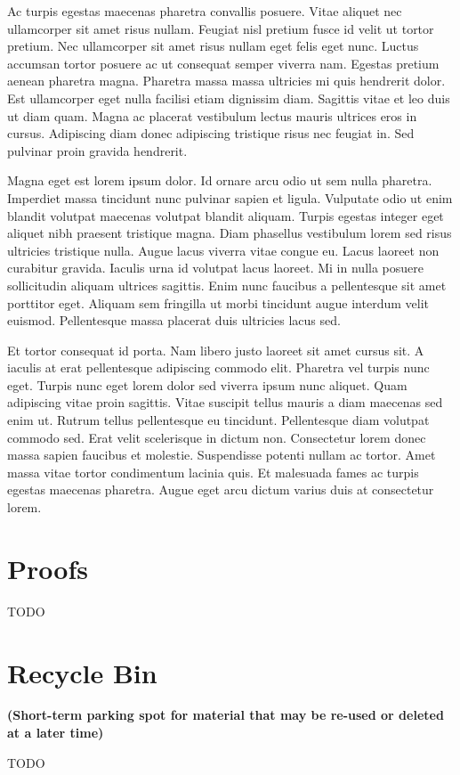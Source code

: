 Ac turpis egestas maecenas pharetra convallis posuere. Vitae aliquet nec
ullamcorper sit amet risus nullam. Feugiat nisl pretium fusce id velit ut
tortor pretium. Nec ullamcorper sit amet risus nullam eget felis eget nunc.
Luctus accumsan tortor posuere ac ut consequat semper viverra nam. Egestas
pretium aenean pharetra magna. Pharetra massa massa ultricies mi quis
hendrerit dolor. Est ullamcorper eget nulla facilisi etiam dignissim diam.
Sagittis vitae et leo duis ut diam quam. Magna ac placerat vestibulum lectus
mauris ultrices eros in cursus. Adipiscing diam donec adipiscing tristique
risus nec feugiat in. Sed pulvinar proin gravida hendrerit.

Magna eget est lorem ipsum dolor. Id ornare arcu odio ut sem nulla pharetra.
Imperdiet massa tincidunt nunc pulvinar sapien et ligula. Vulputate odio ut
enim blandit volutpat maecenas volutpat blandit aliquam. Turpis egestas
integer eget aliquet nibh praesent tristique magna. Diam phasellus vestibulum
lorem sed risus ultricies tristique nulla. Augue lacus viverra vitae congue
eu. Lacus laoreet non curabitur gravida. Iaculis urna id volutpat lacus
laoreet. Mi in nulla posuere sollicitudin aliquam ultrices sagittis. Enim
nunc faucibus a pellentesque sit amet porttitor eget. Aliquam sem fringilla
ut morbi tincidunt augue interdum velit euismod. Pellentesque massa placerat
duis ultricies lacus sed.

Et tortor consequat id porta. Nam libero justo laoreet sit amet cursus sit. A
iaculis at erat pellentesque adipiscing commodo elit. Pharetra vel turpis
nunc eget. Turpis nunc eget lorem dolor sed viverra ipsum nunc aliquet. Quam
adipiscing vitae proin sagittis. Vitae suscipit tellus mauris a diam maecenas
sed enim ut. Rutrum tellus pellentesque eu tincidunt. Pellentesque diam
volutpat commodo sed. Erat velit scelerisque in dictum non. Consectetur lorem
donec massa sapien faucibus et molestie. Suspendisse potenti nullam ac
tortor. Amet massa vitae tortor condimentum lacinia quis. Et malesuada fames
ac turpis egestas maecenas pharetra. Augue eget arcu dictum varius duis at
consectetur lorem.

\newpage

% 

\newpage
\begin{appendices}
\section{Proofs}

TODO



\section{Recycle Bin}
{\textbf{(Short-term parking spot for material that may be re-used or deleted at a later time)}}


TODO

\end{appendices}

